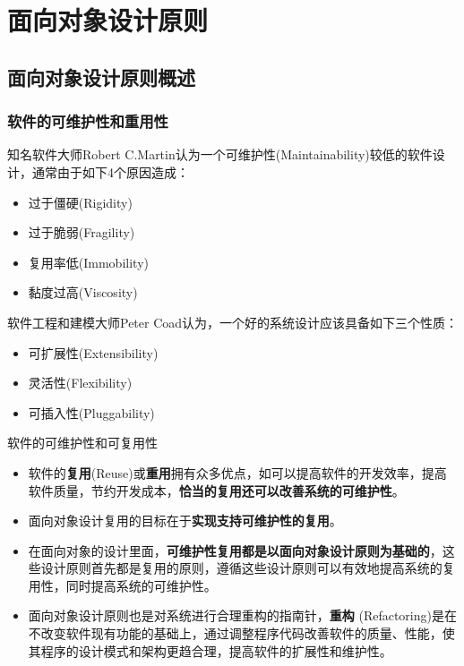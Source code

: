 \section{面向对象设计原则}

\subsection{面向对象设计原则概述}

\subsubsection{软件的可维护性和重用性}
知名软件大师Robert C.Martin认为一个可维护性(Maintainability)较低的软件设计，通常由于如下4个原因造成：
\vspace{-0.8em}
\begin{multicols}{2}
    \begin{itemize}
        \item 过于僵硬(Rigidity)
        \item 过于脆弱(Fragility)
        \item 复用率低(Immobility)
        \item 黏度过高(Viscosity)
    \end{itemize}
    \end{multicols}
\vspace{-1em}

软件工程和建模大师Peter Coad认为，一个好的系统设计应该具备如下三个性质：
\vspace{-0.8em}
\begin{multicols}{3}
    \begin{itemize}
        \item 可扩展性(Extensibility)
        \item 灵活性(Flexibility)
        \item 可插入性(Pluggability)
    \end{itemize}
    \end{multicols}
\vspace{-1em}

软件的可维护性和可复用性
\begin{itemize}
    \item 软件的\textbf{复用}(Reuse)或\textbf{重用}拥有众多优点，如可以提高软件的开发效率，提高软件质量，节约开发成本，\textbf{恰当的复用还可以改善系统的可维护性}。
    \item 面向对象设计复用的目标在于\textbf{实现支持可维护性的复用}。 
    \item 在面向对象的设计里面，\textbf{可维护性复用都是以面向对象设计原则为基础的}，这些设计原则首先都是复用的原则，遵循这些设计原则可以有效地提高系统的复用性，同时提高系统的可维护性。
    \item 面向对象设计原则也是对系统进行合理重构的指南针，\textbf{重构} (Refactoring)是在不改变软件现有功能的基础上，通过调整程序代码改善软件的质量、性能，使其程序的设计模式和架构更趋合理，提高软件的扩展性和维护性。
\end{itemize}

